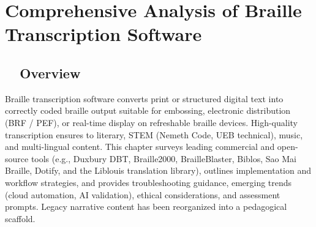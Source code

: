 \chapter{Comprehensive Analysis of Braille Transcription Software}
\label{chap:braille-transcription-\gidx{software}{software}}

\section{~~Overview}
\label{sec:braille-overview}
Braille transcription software converts print or structured digital text into correctly coded braille output suitable for embossing, electronic distribution (BRF / PEF), or real-time display on refreshable braille devices. High-quality transcription ensures  to literary, STEM (Nemeth Code, UEB technical), music, and multi-lingual content. This chapter surveys leading commercial and open-source tools (e.g., Duxbury DBT\supercite{Duxbury}, Braille2000\supercite{Braille2000}, BrailleBlaster\supercite{BrailleBlaster}, Biblos\supercite{Biblos}, Sao Mai Braille\supercite{SMB}, Dotify\supercite{Dotify}, and the Liblouis\supercite{Liblouis} translation library), outlines implementation and workflow strategies, and provides troubleshooting guidance, emerging trends (cloud automation, AI validation), ethical considerations, and assessment prompts. Legacy narrative content has been reorganized into a pedagogical scaffold.

